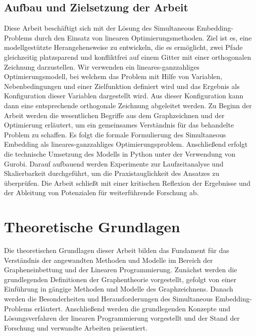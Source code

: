 \documentclass[bachelor, german]{algothesis}
\begin{document}
\section{Aufbau und Zielsetzung der Arbeit}
Diese Arbeit beschäftigt sich mit der Lösung des Simultaneous Embedding-Problems durch den Einsatz von linearen Optimierungsmethoden. Ziel ist es, eine modellgestützte Herangehensweise zu entwickeln, die es ermöglicht, zwei Pfade gleichzeitig platzsparend und konfliktfrei auf einem Gitter mit einer orthogonalen Zeichnung darzustellen. Wir verwenden ein lineares-ganzzahliges Optimierungsmodell, bei welchem das Problem mit Hilfe von Variablen, Nebenbedingungen und einer Zielfunktion definiert wird und das Ergebnis als Konfiguration dieser Variablen dargestellt wird. Aus dieser Konfiguration kann dann eine entsprechende orthogonale Zeichnung abgeleitet werden. \newline
Zu Beginn der Arbeit werden die wesentlichen Begriffe aus dem Graphzeichnen und der Optimierung erläutert, um ein gemeinsames Verständnis für das behandelte Problem zu schaffen. Es folgt die formale Formulierung des Simultaneous Embedding als lineares-ganzzahliges Optimierungsproblem. Anschließend erfolgt die technische Umsetzung des Modells in Python unter der Verwendung von Gurobi. Darauf aufbauend werden Experimente zur Laufzeitanalyse und Skalierbarkeit durchgeführt, um die Praxistauglichkeit des Ansatzes zu überprüfen. Die Arbeit schließt mit einer kritischen Reflexion der Ergebnisse und der Ableitung von Potenzialen für weiterführende Forschung ab.


\chapter{Theoretische Grundlagen}
Die theoretischen Grundlagen dieser Arbeit bilden das Fundament für das Verständnis der angewandten Methoden und Modelle im Bereich der Grapheneinbettung und der Linearen Programmierung. Zunächst werden die grundlegenden Definitionen der Graphentheorie vorgestellt, gefolgt von einer Einführung in gängige Methoden und Modelle des Graphzeichnens. Danach werden die Besonderheiten und Herausforderungen des Simultaneous Embedding-Problems erläutert. Anschließend werden die grundlegenden Konzepte und Lösungsverfahren der linearen Programmierung vorgestellt und der Stand der Forschung und verwandte Arbeiten präsentiert.
\end{document}
